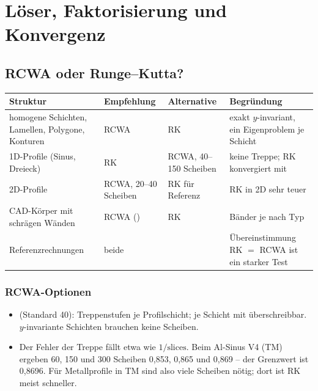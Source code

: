 \chapter{Löser, Faktorisierung und Konvergenz}\label{ch:loeser}

\section{RCWA oder Runge--Kutta?}
%
\begin{center}
\small
\begin{tabularx}{\linewidth}{>{\raggedright\arraybackslash}p{3.7cm}>{\raggedright\arraybackslash}p{2.6cm}>{\raggedright\arraybackslash}p{3.0cm}Y}
\toprule
Struktur & Empfehlung & Alternative & Begründung \\
\midrule
homogene Schichten, Lamellen, Polygone, Konturen & RCWA & RK & exakt $y$-invariant, ein Eigenproblem je Schicht \\
1D-Profile (Sinus, Dreieck) & RK & RCWA, 40--150 Scheiben & keine Treppe; RK konvergiert mit  \\
2D-Profile & RCWA, 20--40 Scheiben & RK für Referenz & RK in 2D sehr teuer \\
CAD-Körper mit schrägen Wänden & RCWA () & RK & Bänder je nach Typ \\
Referenzrechnungen & beide & & Übereinstimmung RK $=$ RCWA ist ein starker Test \\
\bottomrule
\end{tabularx}
\end{center}

\subsection{RCWA-Optionen}
\begin{itemize}
  \item {} (Standard 40): Treppenstufen je Profilschicht; je Schicht mit  überschreibbar.
        $y$-invariante Schichten brauchen keine Scheiben.
  \item Der Fehler der Treppe fällt etwa wie $1/\text{slices}$. Beim Al-Sinus V4 (TM) ergeben 60, 150 und 300
        Scheiben 0,853, 0,865 und 0,869 -- der Grenzwert ist 0,8696. Für Metallprofile in TM sind also viele Scheiben
        nötig; dort ist RK meist schneller.
\end{itemize}

